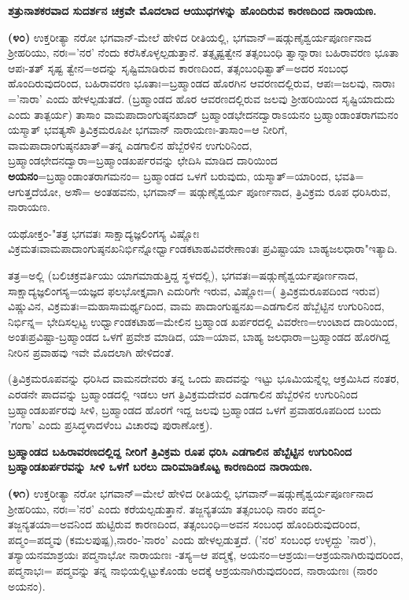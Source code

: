 \begin{center}
\textbf{ಶತ್ರುನಾಶಕರವಾದ ಸುದರ್ಶನ ಚಕ್ರವೇ ಮೊದಲಾದ ಆಯುಧಗಳನ್ನು ಹೊಂದಿರುವ ಕಾರಣದಿಂದ ನಾರಾಯಣ.}
\end{center}

\textbf{(೪೦)} ಉಕ್ತರೀತ್ಯಾ ನರೋ ಭಗವಾನ್-ಮೇಲೆ ಹೇಳಿದ ರೀತಿಯಲ್ಲಿ, ಭಗವಾನ್=\-ಷಡ್ಗುಣೈಶ್ವರ್ಯಪೂರ್ಣನಾದ ಶ‍್ರೀಹರಿಯು, ನರಃ='ನರ' ನೆಂದು ಕರೆಸಿಕೊಳ್ಳಲ್ಪಡುತ್ತಾನೆ. ತತ್ಸೃಷ್ಟತ್ವೇನ ತತ್ಸಂಬಂಧಿ ತ್ವಾನ್ನಾರಾಃ ಬಹಿರಾವರಣ ಭೂತಾ ಆಪಃ-ತತ್ ಸೃಷ್ಟ ತ್ವೇನ=ಅದನ್ನು ಸೃಷ್ಟಿಮಾಡಿರುವ ಕಾರಣದಿಂದ, ತತ್ಸಂಬಂಧಿತ್ವಾತ್=ಅದರ ಸಂಬಂಧ ಹೊಂದಿರುವುದರಿಂದ, ಬಹಿರಾವರಣ ಭೂತಾಃ=ಬ್ರಹ್ಮಾಂಡದ ಹೊರಗಿನ ಆವರಣದಲ್ಲಿರುವ, ಆಪಃ=\-ಜಲವು, ನಾರಾಃ ='ನಾರಾ' ಎಂದು ಹೇಳಲ್ಪಡುತದೆ. (ಬ್ರಹ್ಮಾಂಡದ ಹೊರ ಆವರಣದಲ್ಲಿರುವ ಜಲವು ಶ‍್ರೀಹರಿಯಿಂದ ಸೃಷ್ಟಿಯಾದುದು ಎಂದು ತಾತ್ಪರ್ಯ) ತಾಸಾಂ ವಾಮಪಾದಾಂಗುಷ್ಠನಖಾದ್ ಬ್ರಹ್ಮಾಂಡಭೇದನದ್ವಾರಾಽಯನಂ ಬ್ರಹ್ಮಾಂಡಾಂತರಾಗಮನಂ ಯಸ್ಮಾತ್ ಭವತ್ಯಸೌ ತ್ರಿವಿಕ್ರಮರೂಪೀ ಭಗವಾನ್ ನಾರಾಯಣಃ-ತಾಸಾಂ=ಆ ನೀರಿಗೆ, ವಾಮಪಾದಾಂಗುಷ್ಠನಖಾತ್=ತನ್ನ ಎಡಗಾಲಿನ ಹೆಬ್ಬೆರಳಿನ ಉಗುರಿನಿಂದ, ಬ್ರಹ್ಮಾಂಡಛೇದನದ್ವಾರಾ=ಬ್ರಹ್ಮಾಂಡಖರ್ಪರವನ್ನು ಛೇದಿಸಿ ಮಾಡಿದ ದಾರಿಯಿಂದ \textbf{ಅಯನಂ}=ಬ್ರಹ್ಮಾಂಡಾಂತರಾ\-ಗಮನಂ= ಬ್ರಹ್ಮಾಂಡದ ಒಳಗೆ ಬರುವುದು, ಯಸ್ಮಾತ್=ಯಾರಿಂದ, ಭವತಿ= ಆಗುತ್ತದೆಯೋ, ಅಸೌ= ಅಂತಹವನು, ಭಗವಾನ್= ಷಡ್ಗುಣೈಶ್ವರ್ಯ ಪೂರ್ಣನಾದ, ತ್ರಿವಿಕ್ರಮ ರೂಪ ಧರಿಸಿರುವ, ನಾರಾಯಣ.

ಯಥೋಕ್ತಂ-"ತತ್ರ ಭಗವತಃ ಸಾಕ್ಷಾದ್ಯಜ್ಞಲಿಂಗಸ್ಯ ವಿಷ್ಣೋಃ ವಿಕ್ರಮತಃವಾಮಪಾದಾಂ\-ಗುಷ್ಠನಖನಿರ್ಭಿನ್ನೋರ್ಧ್ವಾಂಡಕಟಾಹವಿವರೇಣಾಂತಃ ಪ್ರವಿಷ್ಟಾಯಾ ಬಾಹ್ಯಜಲಧಾರಾ"\break ಇತ್ಯಾದಿ.

ತತ್ರ=ಅಲ್ಲಿ (ಬಲಿಚಕ್ರವರ್ತಿಯು ಯಾಗಮಾಡುತ್ತಿದ್ದ ಸ್ಥಳದಲ್ಲಿ), ಭಗವತಃ=ಷಡ್ಗುಣೈ\-ಶ್ವರ್ಯಪೂರ್ಣನಾದ, ಸಾಕ್ಷಾದ್ಯಜ್ಞಲಿಂಗಸ್ಯ=ಯಜ್ಞದ ಫಲಭೋಕ್ತೃವಾಗಿ ಎದುರಿಗೇ ಇರುವ, ವಿಷ್ಣೋಃ=( ತ್ರಿವಿಕ್ರಮರೂಪದಿಂದ ಇರುವ) ವಿಷ್ಣುವಿನ, ವಿಕ್ರಮತಃ=ಮಹಾಸಾಮರ್ಥ್ಯದಿಂದ, ವಾಮ ಪಾದಾಂಗುಷ್ಟನಖ=ಎಡಗಾಲಿನ ಹೆಬ್ಬೆಟ್ಟಿನ ಉಗುರಿನಿಂದ, ನಿರ್ಭಿನ್ನ= ಭೇದಿಸಲ್ಪಟ್ಟ ಉರ್ಧ್ವಾಂಡಕಟಾಹ=ಮೇಲಿನ ಬ್ರಹ್ಮಾಂಡ ಖರ್ಪರದಲ್ಲಿ ವಿವರೇಣ=ಉಂಟಾದ ದಾರಿಯಿಂದ, ಅಂತಃಪ್ರವಿಷ್ಟಾ-ಬ್ರಹ್ಮಾಂಡದ ಒಳಗೆ ಪ್ರವೇಶ ಮಾಡಿದ, ಯಾ=ಯಾವ, ಬಾಹ್ಯ ಜಲ\-ಧಾರಾ=ಬ್ರಹ್ಮಾಂಡದ ಹೊರಗಿದ್ದ ನೀರಿನ ಪ್ರವಾಹವು ಇವೇ ಮೊದಲಾಗಿ ಹೇಳಿದಂತೆ.

(ತ್ರಿವಿಕ್ರಮರೂಪವನ್ನು ಧರಿಸಿದ ವಾಮನದೇವರು ತನ್ನ ಒಂದು ಪಾದವನ್ನು ಇಟ್ಟು ಭೂಮಿಯನ್ನೆಲ್ಲ ಆಕ್ರಮಿಸಿದ ನಂತರ, ಎರಡನೇ ಪಾದವನ್ನು ಬ್ರಹ್ಮಾಂಡದಲ್ಲಿ ಇಡಲು ಆಗ ತ್ರಿವಿಕ್ರಮದೇವರ ಎಡಗಾಲಿನ ಹೆಬ್ಬೆರಳಿನ ಉಗುರಿನಿಂದ ಬ್ರಹ್ಮಾಂಡಖರ್ಪರವು ಸೀಳಿ, ಬ್ರಹ್ಮಾಂಡದ ಹೊರಗೆ ಇದ್ದ ಜಲವು ಬ್ರಹ್ಮಾಂಡದ ಒಳಗೆ ಪ್ರವಾಹರೂಪದಿಂದ ಬಂದು 'ಗಂಗಾ' ಎಂದು ಪ್ರಸಿದ್ಧಳಾದಳೆಂಬ ವಿಚಾರವು ಪುರಾಣೋಕ್ತ).

\begin{center}
\textbf{ಬ್ರಹ್ಮಾಂಡದ ಬಹಿರಾವರಣದಲ್ಲಿದ್ದ ನೀರಿಗೆ ತ್ರಿವಿಕ್ರಮ ರೂಪ ಧರಿಸಿ ಎಡಗಾಲಿನ ಹೆಬ್ಬೆಟ್ಟಿನ ಉಗುರಿನಿಂದ ಬ್ರಹ್ಮಾಂಡಖರ್ಪರವನ್ನು ಸೀಳಿ ಒಳಗೆ ಬರಲು ದಾರಿಮಾಡಿಕೊಟ್ಟ ಕಾರಣದಿಂದ ನಾರಾಯಣ.}
\end{center}

\textbf{(೪೧)} ಉಕ್ತರೀತ್ಯಾ ನರೋ ಭಗವಾನ್=ಮೇಲೆ ಹೇಳಿದ ರೀತಿಯಲ್ಲಿ ಭಗವಾನ್=ಷಡ್ಗುಣೈ\-ಶ್ವರ್ಯಪೂರ್ಣನಾದ ಶ‍್ರೀಹರಿಯು, ನರಃ='ನರ' ಎಂದು ಕರೆಯಲ್ಪಡುತ್ತಾನೆ. ತಜ್ಜನ್ಯತಯಾ ತತ್ಸಂಬಂಧಿ ನಾರಂ ಪದ್ಮಂ-ತಜ್ಜನ್ಯತಯಾ=ಅವನಿಂದ ಹುಟ್ಟಿರುವ ಕಾರಣದಿಂದ, ತತ್ಸಂಬಂಧಿ=ಅವನ ಸಂಬಂಧ ಹೊಂದಿರುವುದರಿಂದ, ಪದ್ಮಂ=ಪದ್ಮವು (ಕಮಲಪುಷ್ಪ),\break ನಾರಂ-'ನಾರಂ' ಎಂದು ಹೇಳಲ್ಪಡುತ್ತದೆ. ('ನರ' ಸಂಬಂಧ ಉಳ್ಳದ್ದು 'ನಾರ'), ತಸ್ಯಾಯನಮಾಶ್ರಯಃ ಪದ್ಮನಾಭೋ ನಾರಾಯಣಃ -ತಸ್ಯ=ಆ ಪದ್ಮಕ್ಕೆ, ಅಯನಂ=ಆಶ್ರಯಃ=ಆಶ್ರಯ\-ನಾಗಿರುವುದರಿಂದ, ಪದ್ಮನಾಭಃ= ಪದ್ಮವನ್ನು ತನ್ನ ನಾಭಿಯಲ್ಲಿಟ್ಟುಕೊಂಡು ಅದಕ್ಕೆ ಆಶ್ರಯನಾಗಿರುವುದರಿಂದ, ನಾರಾಯಣಃ (ನಾರಂ ಅಯನಂ).

